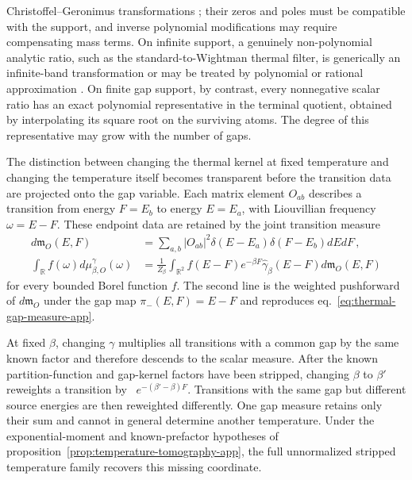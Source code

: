 \documentclass[a4paper,11pt]{article}
\def\dd{d}%
\def\ee{e}%
\theoremstyle{definition}
\theoremstyle{remark}
\newcommand{\dd}{\mathrm d}
\newcommand{\ee}{\mathrm e}
\newcommand{\RR}{\mathbb R}
\begin{document}
Christoffel--Geronimus transformations
\cite{BuenoMarcellan2004,Zhedanov1997}; their zeros and poles must be
compatible with the support, and inverse polynomial modifications may
require compensating mass terms.  On infinite support, a genuinely
non-polynomial analytic ratio, such as the standard-to-Wightman thermal
filter, is generically an infinite-band transformation or may be treated
by polynomial or rational approximation \cite{GutlebOlverSlevinsky2024}.  On
finite gap support, by contrast, every nonnegative scalar ratio has an
exact polynomial representative in the terminal quotient, obtained by
interpolating its square root on the surviving atoms.  The degree of this
representative may grow with the number of gaps.

The distinction between changing the thermal kernel at fixed temperature
and changing the temperature itself becomes transparent before the
transition data are projected onto the gap variable.  Each matrix element
$O_{ab}$ describes a transition from energy $F=E_b$ to energy $E=E_a$,
with Liouvillian frequency $\omega=E-F$.  These endpoint data are retained
by the joint transition measure
\begin{equation}
\begin{aligned}
   \dd\mathfrak m_O(E,F)
   &=
   \sum_{a,b}|O_{ab}|^2
   \delta(E-E_a)\delta(F-E_b)\dd E\dd F\,,\\
   \int_{\RR}f(\omega)\dd\mu^\gamma_{\beta,O}(\omega)
   &=
   \frac{1}{Z_\beta}
   \int_{\RR^2}
   f(E-F)\ee^{-\beta F}
   \widehat\gamma_\beta(E-F)
   \dd\mathfrak m_O(E,F)
\end{aligned}
   \label{eq:bivariate-transition-measure-app}
\end{equation}
for every bounded Borel function $f$.  The second line is the weighted
pushforward of $\dd\mathfrak m_O$ under the gap map
$\pi_-(E,F)=E-F$ and reproduces
eq.~\eqref{eq:thermal-gap-measure-app}.

At fixed $\beta$, changing $\gamma$ multiplies all transitions with a common gap by the same
known factor and therefore descends to the scalar measure.  After the known partition-function and gap-kernel
factors have been stripped, changing $\beta$ to $\beta'$ reweights a transition by~
$\ee^{-(\beta'-\beta)F}$.  Transitions with the same gap but different source
energies are then reweighted differently.  One gap measure retains only their sum and cannot in
general determine another temperature.  Under the exponential-moment and known-prefactor hypotheses of
proposition~\ref{prop:temperature-tomography-app}, the full unnormalized stripped temperature family
recovers this missing coordinate.
\end{document}

